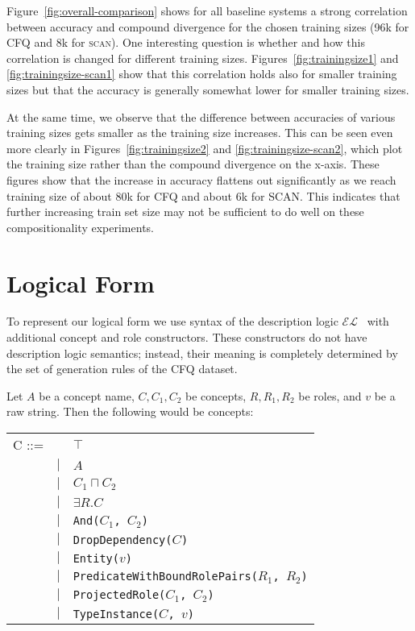 \documentclass[letterpaper]{article}
\newcommand{\SCAN}{\textsc{scan}}
\begin{document}
Figure~\ref{fig:overall-comparison} shows for all baseline systems a strong correlation between accuracy and compound divergence for the chosen training sizes (96k for CFQ and 8k for \SCAN{}). One interesting question is whether and how this correlation is changed for different training sizes. Figures~\ref{fig:trainingsize1} and \ref{fig:trainingsize-scan1} show that this correlation holds also for smaller training sizes but that the accuracy is generally somewhat lower for smaller training sizes.

At the same time, we observe that the difference between accuracies of various training sizes gets smaller as the training size increases. This can be seen even more clearly in Figures~\ref{fig:trainingsize2} and \ref{fig:trainingsize-scan2}, which plot the training size rather than the compound divergence on the x-axis. These figures show that the increase in accuracy flattens out significantly as we reach training size of about 80k for CFQ and about 6k for SCAN. 
This indicates that further increasing train set size may not be sufficient to do well on these compositionality experiments.





\section{Logical Form}
\label{suppl:logical-form}

To represent our logical form we use syntax of the description logic $\mathcal{EL}$~\citep{baader2003description,baader2005el} with additional concept and role constructors. These constructors do not have description logic semantics; instead, their meaning is completely determined by the set of generation rules of the CFQ dataset.

Let $A$ be a concept name, $C, C_1, C_2$ be concepts, $R, R_1, R_2$ be roles, and $v$ be a raw string. Then the following would be concepts:

\begin{tabular}{r cl}
    C ::= & & $\top$ \\
          & $\mid$ & $A$ \\
          & $\mid$ & $C_1\sqcap C_2$ \\
          & $\mid$ & $\exists R.C$ \\
          & $\mid$ & \texttt{And($C_1$, $C_2$)} \\
          & $\mid$ & \texttt{DropDependency($C$)} \\
          & $\mid$ & \texttt{Entity($v$)} \\
          & $\mid$ & \texttt{PredicateWithBoundRolePairs($R_1$, $R_2$)} \\
          & $\mid$ & \texttt{ProjectedRole($C_1$, $C_2$)} \\
          & $\mid$ & \texttt{TypeInstance($C$, $v$)}
\end{tabular}
\end{document}
